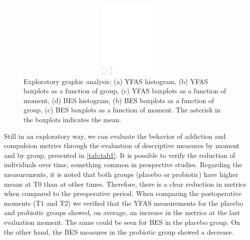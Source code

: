 \documentclass[AMA,STIX1COL]{WileyNJD-v2}
\begin{document}
\begin{figure}[h]
\centerline{\includegraphics[width=342pt,height=9pc,draft]{empty}}
\caption{Exploratory graphic analysis: (a) YFAS histogram, (b) YFAS boxplots as a function of group, (c) YFAS boxplots as a function of moment, (d) BES histogram, (b) BES boxplots as a function of group, (c) BES boxplots as a function of moment. The asterisk in the boxplots indicates the mean.\label{fig1}}
\end{figure}

Still in an exploratory way, we can evaluate the behavior of addiction and compulsion metrics through the evaluation of descriptive measures by moment and by group, presented in \autoref{tab:tab1}. It is possible to verify the reduction of individuals over time, something common in prospective studies. Regarding the measurements, it is noted that both groups (placebo or probiotic) have higher means at T0 than at other times. Therefore, there is a clear reduction in metrics when compared to the preoperative period. When comparing the postoperative moments (T1 and T2) we verified that the YFAS measurements for the placebo and probiotic groups showed, on average, an increase in the metrics at the last evaluation moment. The same could be seen for BES in the placebo group. On the other hand, the BES measures in the probiotic group showed a decrease.
\end{document}
